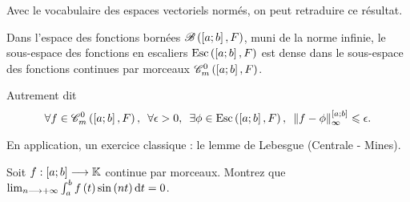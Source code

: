 Avec le vocabulaire des espaces vectoriels normés, on peut retraduire ce résultat.

\begin{prop}
Dans l'espace des fonctions bornées \(\fonctionsbornees[\intervii{a}{b}][F]\), muni de la norme infinie, le sous-espace des fonctions en escaliers \(\Esc[\intervii{a}{b}][F]\) est dense dans le sous-espace des fonctions continues par morceaux \(\contm[\intervii{a}{b}][F]\).

Autrement dit \[\quantifs{\forall f\in\contm[\intervii{a}{b}][F];\forall\epsilon>0;\exists\phi\in\Esc[\intervii{a}{b}][F]}\norme{f-\phi}_\infty^{\intervii{a}{b}}\leq\epsilon.\]
\end{prop}

En application, un exercice classique : le lemme de Lebesgue (Centrale - Mines).

\begin{exo}
Soit \(f:\left[a;b\right]\longrightarrow\mathbb{K}\) continue par morceaux. Montrez que \(\lim_{n\to\pinf}\int_a^bf\paren{t}\sin\paren{nt}\odif{t}=0\).
\end{exo}

